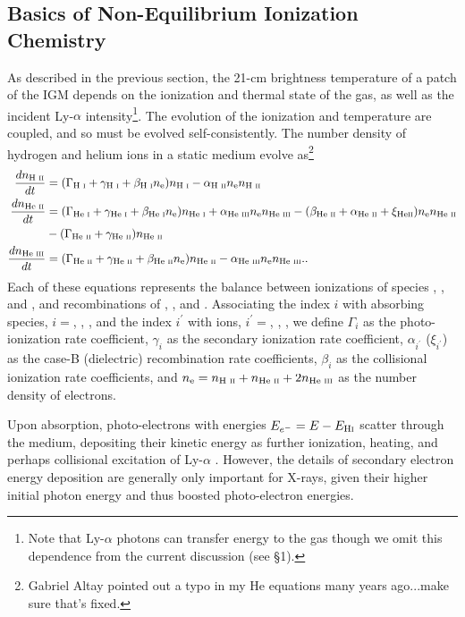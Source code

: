 \subsection{Basics of Non-Equilibrium Ionization Chemistry} \label{sec:ioniz_heating}
As described in the previous section, the 21-cm brightness temperature of a patch of the IGM depends on the ionization and thermal state of the gas, as well as the incident Ly-$\alpha$ intensity\footnote{Note that Ly-$\alpha$ photons can transfer energy to the gas though we omit this dependence from the current discussion (see \S1).}. The evolution of the ionization and temperature are coupled, and so must be evolved self-consistently. The number density of hydrogen and helium ions in {\color{red} a static medium} evolve as\footnote{{\color{red} Gabriel Altay pointed out a typo in my He equations many years ago...make sure that's fixed.}}
\begin{align}
    \frac{d n_{\text{H } \textsc{ii}}}{dt} & = (\Gamma_{\text{H } \textsc{i}} + \gamma_{\text{H } \textsc{i}} + \beta_{\text{H } \textsc{i}} n_{\text{e}}) n_{\text{H } \textsc{i}} - \alpha_{\text{H } \textsc{ii}} n_{\text{e}} n_{\text{H } \textsc{ii}}   \label{eq:HIIRateEquation} \\
    \frac{d n_{\text{He } \textsc{ii}}}{dt} & = (\Gamma_{\text{He } \textsc{i}} + \gamma_{\text{He } \textsc{i}} + \beta_{\text{He } \textsc{i}} n_{\text{e}}) n_{\text{He } \textsc{i}} \nonumber + \alpha_{\text{He } \textsc{iii}} n_{\text{e}} n_{\text{He } \textsc{iii}}  - (\beta_{\text{He } \textsc{ii}} + \alpha_{\text{He } \textsc{ii}} + \xi_{\text{He} \textsc{ii}}) n_{\text{e}} n_{\text{He } \textsc{ii}} \\ & - (\Gamma_{\text{He } \textsc{ii}} + \gamma_{\text{He } \textsc{ii}}) n_{\text{He } \textsc{ii}} \label{eq:HeIIRateEquation} \\ 
    \frac{d n_{\text{He } \textsc{iii}}}{dt} & = (\Gamma_{\text{He } \textsc{ii}} + \gamma_{\text{He } \textsc{ii}} + \beta_{\text{He } \textsc{ii}} n_{\text{e}}) n_{\text{He } \textsc{ii}}  - \alpha_{\text{He } \textsc{iii}} n_{\text{e}} n_{\text{He } \textsc{iii}} . \label{eq:HeIIIRateEquation} .
\end{align}
Each of these equations represents the balance between ionizations of species
\HI, \HeI, and \HeII, and recombinations of \HII, \HeII, and
\HeIII. Associating the index $i$ with absorbing species, $i = $\HI, \HeI,
\HeII, and the index $i^{\prime}$ with ions, $i^{\prime} = $\HII, \HeII,
\HeIII, we define $\Gamma_i$ as the photo-ionization rate coefficient,
$\gamma_i$ as the secondary ionization rate coefficient, $\alpha_{i^{\prime}}$
($\xi_{i^{\prime}}$) as the case-B (dielectric) recombination rate
coefficients, $\beta_i$ as the collisional ionization rate coefficients, and
$n_{\text{e}} = n_{\text{H } \textsc{ii}} + n_{\text{He } \textsc{ii}} + 2n_{\text{He } \textsc{iii}}$ as the number density of electrons.

Upon absorption, photo-electrons with energies $E_{e^-} = E - E_{\text{H} {\textsc{i}}}$ scatter through the medium, depositing their kinetic energy as further ionization, heating, and perhaps collisional excitation of Ly-$\alpha$ \cite{Shull1979,Shull1985,Furlanetto2010}. However, the details of secondary electron energy deposition are generally only important for X-rays, given their higher initial photon energy and thus boosted photo-electron energies.

